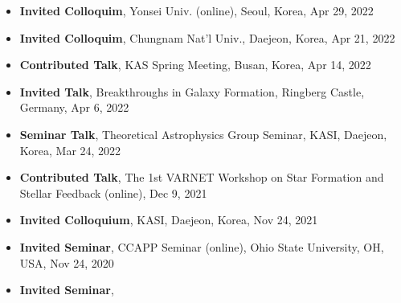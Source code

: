 \documentclass[11pt,letterpaper,roman]{moderncv}        %
\newenvironment{benumerate}[1]{
  \let\oldItem\item
  \def\item{\addtocounter{enumi}{-2}\oldItem}
  \begin{enumerate}[itemsep=0.0mm]
    \setcounter{enumi}{#1}
    \addtocounter{enumi}{1}
  }{
  \end{enumerate}
}
\begin{document}
\begin{itemize}
  \setlength\itemsep{0em}
\item \textbf{Invited Colloquim},
  Yonsei Univ. (online), Seoul, Korea, Apr 29, 2022
\item \textbf{Invited Colloquim},
  Chungnam Nat'l Univ., Daejeon, Korea, Apr 21, 2022
\item \textbf{Contributed Talk},
  KAS Spring Meeting, Busan, Korea, Apr 14, 2022
\item \textbf{Invited Talk},
  Breakthroughs in Galaxy Formation, Ringberg Castle, Germany, Apr 6, 2022
\item \textbf{Seminar Talk},
  Theoretical Astrophysics Group Seminar, KASI, Daejeon, Korea, Mar 24, 2022
\item \textbf{Contributed Talk},
  The 1st VARNET Workshop on Star Formation and Stellar Feedback (online), Dec 9, 2021
\item \textbf{Invited Colloquium},
  KASI, Daejeon, Korea, Nov 24, 2021
\item \textbf{Invited Seminar},
  CCAPP Seminar (online), Ohio State University, OH, USA, Nov 24, 2020
\item \textbf{Invited Seminar},

\end{itemize}
\end{document}

